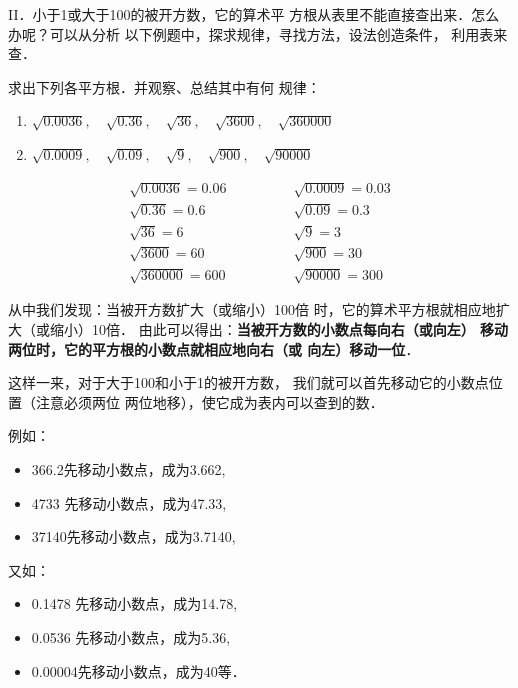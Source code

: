 \textrm{II}．小于1或大于100的被开方数，它的算术平
方根从表里不能直接查出来．怎么办呢？可以从分析
以下例题中，探求规律，寻找方法，设法创造条件，
利用表来查．


\begin{example}
    求出下列各平方根．并观察、总结其中有何
规律：
\begin{enumerate}
    \item $\sqrt{0.0036},\quad \sqrt{0.36},\quad \sqrt{36},\quad \sqrt{3600},\quad \sqrt{360000}$
    \item $\sqrt{0.0009},\quad \sqrt{0.09},\quad \sqrt{9},\quad \sqrt{900},\quad \sqrt{90000} $
\end{enumerate}
\end{example}

\begin{solution}
\[\begin{array}{ll}
    \sqrt{0.0036}=0.06\qquad \qquad  &  \sqrt{0.0009}=0.03 \\
     \sqrt{0.36}=0.6 &  \sqrt{0.09}=0.3\\
      \sqrt{36}=6 & \sqrt{9}=3 \\
      \sqrt{3600}=60 &  \sqrt{900}=30 \\
       \sqrt{360000}=600 &  \sqrt{90000} =300
\end{array}\]
\end{solution}

从中我们发现：当被开方数扩大（或缩小）100倍
时，它的算术平方根就相应地扩大（或缩小）10倍．
由此可以得出：\textbf{当被开方数的小数点每向右（或向左）
移动两位时，它的平方根的小数点就相应地向右（或
向左）移动一位}．

这样一来，对于大于100和小于1的被开方数，
我们就可以首先移动它的小数点位置（注意必须两位
两位地移），使它成为表内可以查到的数．

例如：
\begin{itemize}
    \item 366.2先移动小数点，成为3.662,
    \item 4733 先移动小数点，成为47.33,
    \item 37140先移动小数点，成为3.7140,
\end{itemize}

又如：
\begin{itemize}
    \item 0.1478 先移动小数点，成为14.78,
    \item 0.0536 先移动小数点，成为5.36,
    \item 0.00004先移动小数点，成为40等．
\end{itemize}

